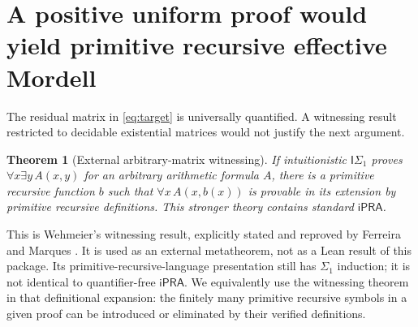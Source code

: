 \documentclass[11pt,letterpaper]{article}
\newcommand{\iPRA}{\mathsf{iPRA}}
\newtheorem{theorem}{Theorem}[section]
\theoremstyle{definition}
\begin{document}
\section{A positive uniform proof would yield primitive recursive effective Mordell}
\label{sec:witness}
The residual matrix in \eqref{eq:target} is universally quantified.
A witnessing result restricted to decidable existential matrices would
not justify the next argument.

\begin{theorem}[External arbitrary-matrix witnessing]\label{thm:external}
If intuitionistic $\mathsf I\Sigma_1$ proves
$\forall x\exists y\,A(x,y)$ for an arbitrary arithmetic formula $A$,
there is a primitive recursive function $b$ such that
$\forall x\,A(x,b(x))$ is provable in its extension by primitive
recursive definitions. This stronger theory contains standard $\iPRA$.
\end{theorem}
This is Wehmeier's witnessing result, explicitly stated and reproved
by Ferreira and Marques \cite[p.~14 of the author manuscript]{FM}.
It is used as an external metatheorem, not as a Lean result of this
package. Its primitive-recursive-language presentation still has
$\Sigma_1$ induction; it is not identical to quantifier-free $\iPRA$.
We equivalently use the witnessing theorem in that definitional expansion:
the finitely many primitive recursive symbols in a given proof can be
introduced or eliminated by their verified definitions.
\end{document}
